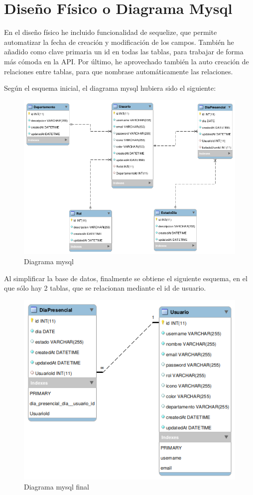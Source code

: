 \documentclass[11pt,spanish,listoffigures,listoftables]{tfgetsinf}
\begin{document}
\section{Diseño Físico o Diagrama Mysql}
En el diseño físico he incluido funcionalidad de sequelize, que permite automatizar la fecha de creación y modificación de los campos.
También he añadido como clave primaria un id en todas las tablas, para trabajar de forma más cómoda en la API.
Por último, he aprovechado también la auto creación de relaciones entre tablas, para que nombrase automáticamente las relaciones.

Según el esquema inicial, el diagrama mysql hubiera sido el siguiente:
\begin{figure}[h!] %
   \includegraphics[scale=0.40]{img/EsquemaBBDD.png}
   \caption{Diagrama mysql}
   \label{fig:diagramaMysql}
 \end{figure}

 Al simplificar la base de datos, finalmente se obtiene el siguiente esquema, en el que sólo hay 2 tablas, que se relacionan mediante el id de usuario. 
 \begin{figure}[h!] %
  \includegraphics[scale=0.40]{img/nuevaBBDD.png}
  \caption{Diagrama mysql final}
  \label{fig:nuevodiagramaMysql}
\end{figure}
\end{document}
